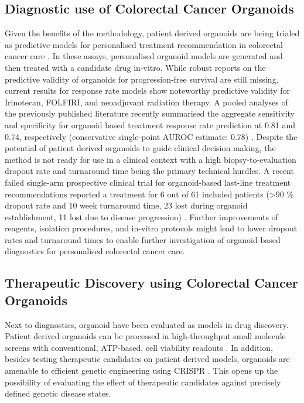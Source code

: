 \begin{flushleft}
\subsection{Diagnostic use of Colorectal Cancer Organoids}

Given the benefits of the methodology, patient derived organoids are being trialed as predictive models for personalised treatment recommendation in colorectal cancer care \citep{vandeweteringProspectiveDerivationLiving2015, vlachogiannisPatientderivedOrganoidsModel2018, ganeshRectalCancerOrganoid2019, ooftPatientderivedOrganoidsCan2019a, yaoPatientDerivedOrganoidsPredict2020a}. In these assays, personalised organoid models are generated and then treated with a candidate drug in-vitro. While robust reports on the predictive validity of organoids for progression-free survival are still missing, current results for response rate models show noteworthy predictive validity for Irinotecan, FOLFIRI, and neoadjuvant radiation therapy. A pooled analyses of the previously published literature recently summarised the aggregate sensitivity and specificity for organoid based treatment response rate prediction at 0.81 and 0.74, respectively (conservative single-point AUROC estimate: 0.78) \citep{wensinkPatientderivedOrganoidsPredictive2021, zhangNoteROCAnalysis2005}. Despite the potential of patient derived organoids to guide clinical decision making, the method is not ready for use in a clinical context with a high biopsy-to-evaluation dropout rate and turnaround time being the primary technical hurdles. A recent failed single-arm prospective clinical trial for organoid-based last-line treatment recommendations reported a treatment for 6 out of 61 included patients (>90 \% dropout rate and 10 week turnaround time, 23 lost during organoid establishment, 11 lost due to disease progression) \citep{ooftProspectiveExperimentalTreatment2021}. Further improvements of reagents, isolation procedures, and in-vitro protocols might lead to lower dropout rates and turnaround times to enable further investigation of organoid-based diagnostics for personalised colorectal cancer care. \par

\subsection{Therapeutic Discovery using Colorectal Cancer Organoids} 

Next to diagnostics, organoid have been evaluated as models in drug discovery. Patient derived organoids can be processed in high-throughput small molecule screens with conventional, ATP-based, cell viability readouts \citep{vandeweteringProspectiveDerivationLiving2015}. In addition, besides testing therapeutic candidates on patient derived models, organoids are amenable to efficient genetic engineering using CRISPR \citep{matanoModelingColorectalCancer2015a, drostUseCRISPRmodifiedHuman2017}. This opens up the possibility of evaluating the effect of therapeutic candidates against precisely defined genetic disease states.


\end{flushleft}
